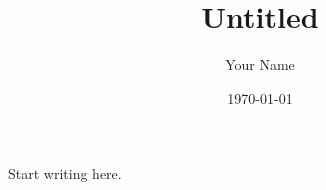 \documentclass[11pt,a4paper]{article}
\title{Untitled}
\author{Your Name}
\date{\today}
\begin{document}
\maketitle

Start writing here.
\end{document}
